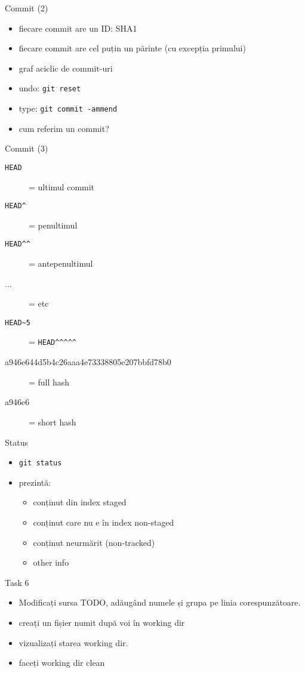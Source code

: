 \documentclass{beamer}
\begin{document}
\begin{frame}{Commit (2)}
  \begin{itemize}
    \item fiecare commit are un ID: SHA1
    \item fiecare commit are cel puțin un părinte (cu excepția primului)
    \item graf aciclic de commit-uri
    \pause
    \item undo: \texttt{git reset}
    \item type: \texttt{git commit -ammend}
    \pause
    \item cum referim un commit?
  \end{itemize}
\end{frame}

\begin{frame}{Commit (3)}
  \begin{description}
    \item[\texttt{HEAD}] = ultimul commit
    \item[\texttt{HEAD\textasciicircum}] = penultimul
    \item[\texttt{HEAD\textasciicircum\textasciicircum}] = antepenultimul
    \item[...] = etc
    \pause
    \item[\texttt{HEAD\textasciitilde5}] = \texttt{HEAD\textasciicircum\textasciicircum\textasciicircum\textasciicircum\textasciicircum}
    \pause
    \item[a946e644d5b4c26aaa4e73338805e207bbfd78b0] = full hash
    \pause
    \item[a946e6] = short hash
  \end{description}
\end{frame}

\begin{frame}{Status}
  \begin{itemize}
    \item \texttt{git status}
    \item prezintă:
      \begin{itemize}
        \item conținut din index {staged}
        \item conținut care nu e în index {non-staged}
        \item conținut neurmărit (non-tracked)
        \item other info
      \end{itemize}
  \end{itemize}
  \pause
  \begin{alertblock}{Task 6}
    \begin{itemize}
      \item Modificați sursa TODO, adăugând numele și grupa pe linia
      corespunzătoare.
      \item creați un fișier numit după voi în working dir
      \item vizualizați starea working dir.
      \item faceți working dir clean
    \end{itemize}
  \end{alertblock}
\end{frame}
\end{document}
